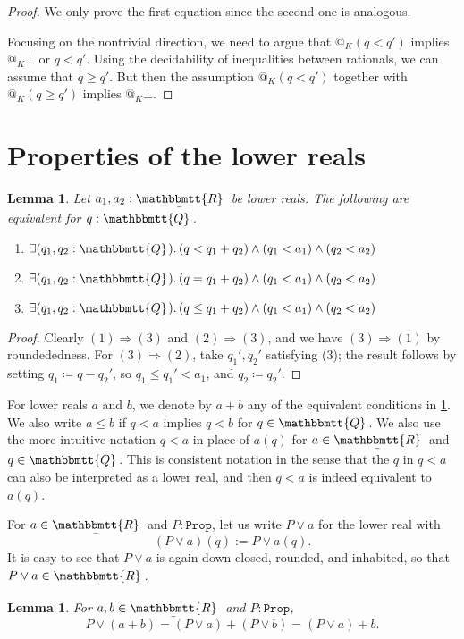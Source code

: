 \documentclass[11pt, oneside, article]{memoir}
\makeatletter
\theoremstyle{plain}
\newtheorem{lemma}[theorem]{Lemma}
\theoremstyle{definition}
\theoremstyle{remark}
\newcommand{\const}[1]{\mathtt{#1}}
\newcommand{\ubar}[1]{\underaccent{\bar}{#1}}
\newcommand{\internal}[1]{\raisebox{-.03ex}{$\mathbbmtt{#1}$}}
\newcommand{\hs}{\hspace{1.1pt}}
\newcommand{\tQQ}{\internal{Q}\hs}
\newcommand{\tRR}{\internal{R}\hs}
\newcommand{\tLR}{\ubar{\tRR}\hs}
\newcommand{\Prop}{\const{Prop}}
\newcommand{\AtSymbol}{{@}}
\newcommand{\At}[2][]{\AtSymbol^{#1}_{#2}}
\newcommand{\imp}{\Rightarrow}
\makeatother
\begin{document}
\begin{proof}
	We only prove the first equation since the second one is analogous.

	Focusing on the nontrivial direction, we need to argue that $\At{K}(q < q')$ implies $\At{K}\bot$ or $q < q'$. Using the decidability of inequalities between rationals, we can assume that $q \geq q'$. But then the assumption $\At{K}(q < q')$ together with $\At{K}(q \geq q')$ implies $\At{K}\bot$.
\end{proof}

\section{Properties of the lower reals}

\begin{lemma}\label{lemma.plus_def}
Let $a_1,a_2:\tLR$ be lower reals. The following are equivalent for $q:\tQQ$.
\begin{enumerate}
	\item $\exists(q_1,q_2:\tQQ)\ldotp (q<q_1+q_2)\wedge(q_1<a_1)\wedge(q_2<a_2)$
	\item $\exists(q_1,q_2:\tQQ)\ldotp (q=q_1+q_2)\wedge(q_1<a_1)\wedge(q_2<a_2)$
	\item $\exists(q_1,q_2:\tQQ)\ldotp (q\leq q_1+q_2)\wedge(q_1<a_1)\wedge(q_2<a_2)$
\end{enumerate}
\end{lemma}
\begin{proof}
Clearly $(1)\imp(3)$ and $(2)\imp(3)$, and we have $(3)\imp(1)$ by roundededness. For $(3)\imp(2)$, take $q_1',q_2'$ satisfying (3); the result follows by setting $q_1\coloneqq q-q_2'$, so $q_1\leq q_1'<a_1$, and $q_2\coloneqq q_2'$.
\end{proof}
For lower reals $a$ and $b$, we denote by $a+b$ any of the equivalent conditions in \cref{lemma.plus_def}. We also write $a\leq b$ if $q < a$ implies $q < b$ for $q\in\tQQ$. We also use the more intuitive notation $q < a$ in place of $a(q)$ for $a\in\tLR$ and $q\in\tQQ$. This is consistent notation in the sense that the $q$ in $q < a$ can also be interpreted as a lower real, and then $q < a$ is indeed equivalent to $a(q)$.

For $a\in\tLR$ and $P : \Prop$, let us write $P \lor a$ for the lower real with
\[
	(P \lor a)(q) := P \lor a(q).
\]
It is easy to see that $P \lor a$ is again down-closed, rounded, and inhabited, so that $P \lor a \in \tLR$. 

\begin{lemma}
	\label{lem.or_add_LR}
	For $a,b\in\tLR$ and $P : \Prop$,
	\[
		P \lor (a + b) = (P \lor a) + (P \lor b) = (P \lor a) + b.
	\]
\end{lemma}
\end{document}
